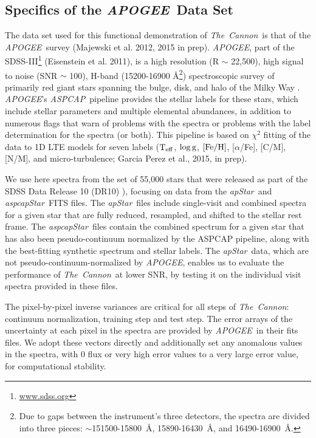 \documentclass[12pt, preprint]{aastex}
\newcommand{\tc}{\textsl{The~Cannon}}
\newcommand{\apogee}{\textsl{APOGEE}}
\newcommand{\aspcap}{\textsl{ASPCAP}}
\newcommand{\aspcapstar}{\textsl{aspcapStar}}
\newcommand{\apstar}{\textsl{apStar}}
\newcommand{\teff}{\mbox{$\rm T_{eff}$}}
\newcommand{\feh}{\mbox{$\rm [Fe/H]$}}
\newcommand{\logg}{\mbox{$\rm \log g$}}
\begin{document}
\subsection{Specifics of the \apogee\ Data Set}
\label{sec:Apogee_as_worked_Example}

The data set used for this functional demonstration of \tc\ is that of the \apogee\ survey (Majewski et al. 2012, 2015 in prep). \apogee, part of the SDSS-III\footnote{\url{www.sdss.org}} (Eisenstein et al. 2011), is a high resolution (R $\sim$ 22,500), high signal to noise (SNR $\sim$ 100), H-band (15200-16900 \AA\footnote{Due to gaps between the instrument's three detectors, the spectra are divided into three pieces: $\sim$151500-15800~\AA, 15890-16430~\AA, and 16490-16900~\AA.}) spectroscopic survey of primarily red giant stars spanning the bulge, disk, and halo of the Milky Way \citep{Zaso2013}.  \apogee 's \aspcap\ pipeline provides the stellar labels for these stars, which include stellar parameters and multiple elemental abundances, in addition to numerous flags that warn of problems with the spectra or problems with the label determination for the spectra (or both).  This pipeline is based on $\chi^2$ fitting of the data to 1D LTE models for seven labels (\teff, \logg, \feh, [$\alpha$/Fe], [C/M], [N/M], and micro-turbulence; Garcia Perez et al., 2015, in prep).

We use here spectra from the set of 55,000 stars that were released as part of the SDSS Data Release 10 (DR10) \citep{Ahn2014}), focusing on data from the \apstar\ and  \aspcapstar\ FITS files. The \apstar\ files include single-visit and combined spectra for a given star that are fully reduced, resampled, and shifted to the stellar rest frame.  The \aspcapstar\ files contain the combined spectrum for a given star that has also been pseudo-continuum normalized by the ASPCAP pipeline, along with the best-fitting synthetic spectrum and stellar labels.  The \apstar\ data, which are not pseudo-continuum-normalized by \apogee, enables us to evaluate the performance of \tc\ at lower SNR, by testing it on the individual visit spectra provided in these files. 

The pixel-by-pixel inverse variances are critical for all steps of \tc: continuum normalization, training step and test step. The error arrays of the uncertainty at each pixel in the spectra are provided by \apogee\ in their fits files. We adopt these vectors directly and additionally set any anomalous values in the spectra, with 0 flux or very high error values to a very large error value, for computational stability.  
\end{document}
